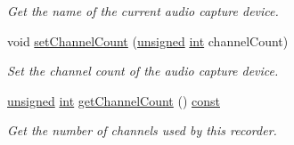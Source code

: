 \begin{DoxyCompactItemize}
\begin{DoxyCompactList}\small\item\em Get the name of the current audio capture device. \end{DoxyCompactList}\item 
void \hyperlink{classsf_1_1_sound_recorder_ae4e22ba67d12a74966eb05fad55a317c}{set\-Channel\-Count} (\hyperlink{curses_8priv_8h_aca40206900cfc164654362fa8d4ad1e6}{unsigned} \hyperlink{term__entry_8h_ad65b480f8c8270356b45a9890f6499ae}{int} channel\-Count)
\begin{DoxyCompactList}\small\item\em Set the channel count of the audio capture device. \end{DoxyCompactList}\item 
\hyperlink{curses_8priv_8h_aca40206900cfc164654362fa8d4ad1e6}{unsigned} \hyperlink{term__entry_8h_ad65b480f8c8270356b45a9890f6499ae}{int} \hyperlink{classsf_1_1_sound_recorder_a994e29ffa9735875efab09edee35203d}{get\-Channel\-Count} () \hyperlink{term__entry_8h_a57bd63ce7f9a353488880e3de6692d5a}{const} 
\begin{DoxyCompactList}\small\item\em Get the number of channels used by this recorder. \end{DoxyCompactList}\end{DoxyCompactItemize}
